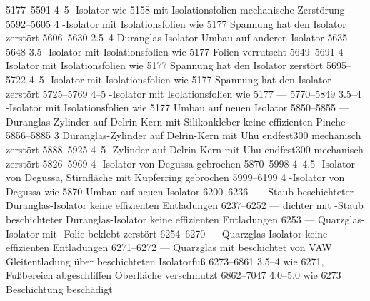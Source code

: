 \begin{tabbing}
    {5177--5591}
    {4--5}
    {\AlO-Isolator wie 5158 mit Isolationsfolien}
    {mechanische Zerstörung}
    {5592--5605}
    {4}
    {\AlO-Isolator mit Isolationsfolien wie 5177}
    {Spannung hat den Isolator zerstört}
    {5606--5630}
    {2.5--4}
    {Duranglas-Isolator}
    {Umbau auf anderen Isolator}
    {5635--5648}
    {3.5}
    {\AlO-Isolator mit Isolationsfolien wie 5177}
    {Folien verrutscht}
    {5649--5691}
    {4}
    {\AlO-Isolator mit Isolationsfolien wie 5177}
    {Spannung hat den Isolator zerstört}
    {5695--5722}
    {4--5}
    {\AlO-Isolator mit Isolationsfolien wie 5177}
    {Spannung hat den Isolator zerstört}
    {5725--5769}
    {4--5}
    {\AlO-Isolator mit Isolationsfolien wie 5177}
    {---}
    {5770--5849}
    {3.5--4}
    {\AlO-Isolator mit Isolationsfolien wie 5177}
    {Umbau auf neuen Isolator}
    {5850--5855}
    {---}
    {Duranglas-Zylinder auf Delrin-Kern mit Silikonkleber}
    {keine effizienten Pinche}
    {5856--5885}
    {3}
    {Duranglas-Zylinder auf Delrin-Kern mit Uhu endfest300}
    {mechanisch zerstört}
    {5888--5925}
    {4--5}
    {\AlO-Zylinder auf Delrin-Kern mit Uhu endfest300}
    {mechanisch zerstört}
    {5826--5969}
    {4}
    {\AlO-Isolator von Degussa}
    {gebrochen}
    {5870--5998}
    {4--4.5}
    {\AlO-Isolator von Degussa, Stirnfläche mit Kupferring}
    {gebrochen}
    {5999--6199}
    {4}
    {\AlO-Isolator von Degussa wie 5870}
    {Umbau auf neuen Isolator}
    {6200--6236}
    {---}
    {\AlO-Staub beschichteter Duranglas-Isolator}
    {keine effizienten Entladungen}
    {6237--6252}
    {---}
    {dichter mit \AlO-Staub beschichteter Duranglas-Isolator}
    {keine effizienten Entladungen}
    {6253}
    {---}
    {Quarzglas-Isolator mit \AlO-Folie beklebt}
    {zerstört}
    {6254--6270}
    {---}
    {Quarzglas-Isolator}
    {keine effizienten Entladungen}
    {6271--6272}
    {---}
    {Quarzglas mit \AlO beschichtet von VAW}
    {Gleitentladung über beschichteten Isolatorfuß}
    {6273--6861}
    {3.5--4}
    {wie 6271, Fußbereich abgeschliffen}
    {Oberfläche verschmutzt}
    {6862--7047}
    {4.0--5.0}
    {wie 6273}
    {Beschichtung beschädigt}

\end{tabbing}
